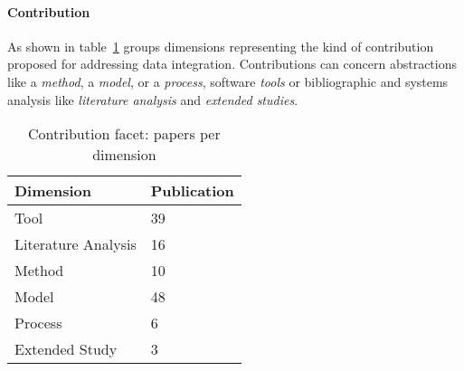 \paragraph{Contribution} 
As shown in table~\ref{table:contribution} groups dimensions representing the kind of contribution proposed for addressing data integration. Contributions can concern abstractions like a
  {\em method}, a  {\em model}, or a {\em process}, software {\em tools} or bibliographic and systems analysis like {\em literature analysis} and {\em extended studies}.

\begin{table}[h]
\begin{center}
\begin{tabular}{p{4cm}p{4cm}}
\hline 
\textbf{Dimension} & \textbf{Publication} \\ 
\hline 
Tool & 39\\ 
\hline 
Literature Analysis & 16 \\ 
\hline 
Method & 10 \\ 
\hline 
Model & 48 \\  
\hline 
Process & 6 \\ 
\hline 
Extended Study & 3 \\ 
\hline 
\end{tabular}
\end{center}
\caption{Contribution facet: papers per dimension}\label{table:contribution}
\end{table}

